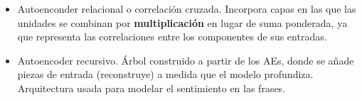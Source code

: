 \begin{enumerate}
\begin{enumerate}
\begin{itemize}
            \item Autoenconder relacional o correlación cruzada. Incorpora capas en las que las unidades se combinan por \textbf{multiplicación} en lugar de suma ponderada, ya que representa las correlaciones entre los componentes de sus entradas.
            
            \item Autoencoder recursivo. Árbol construido a partir de los AEs, donde se añade piezas de entrada (reconstruye) a medida que el modelo profundiza. Arquitectura usada para modelar el sentimiento en las frases.
        \end{itemize}

    \end{enumerate}
    
    
    
\end{enumerate}


